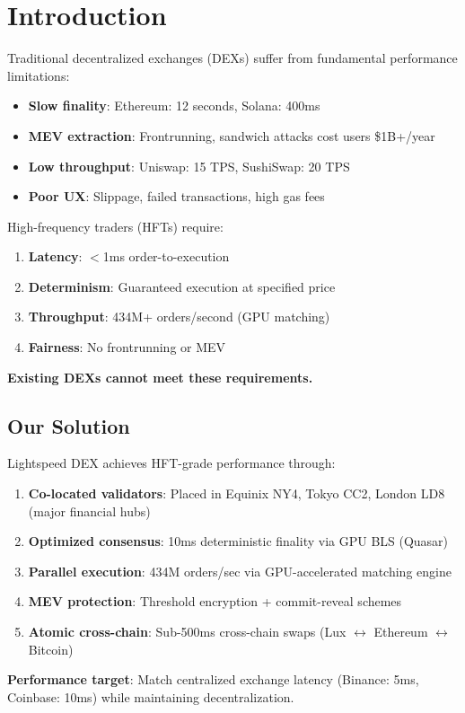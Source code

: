 \section{Introduction}


Traditional decentralized exchanges (DEXs) suffer from fundamental performance limitations:
\begin{itemize}
    \item \textbf{Slow finality}: Ethereum: 12 seconds, Solana: 400ms
    \item \textbf{MEV extraction}: Frontrunning, sandwich attacks cost users \$1B+/year \cite{daian2020}
    \item \textbf{Low throughput}: Uniswap: 15 TPS, SushiSwap: 20 TPS
    \item \textbf{Poor UX}: Slippage, failed transactions, high gas fees
\end{itemize}

High-frequency traders (HFTs) require:
\begin{enumerate}
    \item \textbf{Latency}: $<$1ms order-to-execution
    \item \textbf{Determinism}: Guaranteed execution at specified price
    \item \textbf{Throughput}: 434M+ orders/second (GPU matching)
    \item \textbf{Fairness}: No frontrunning or MEV
\end{enumerate}

\textbf{Existing DEXs cannot meet these requirements.}

\subsection{Our Solution}

Lightspeed DEX achieves HFT-grade performance through:

\begin{enumerate}
    \item \textbf{Co-located validators}: Placed in Equinix NY4, Tokyo CC2, London LD8 (major financial hubs)
    \item \textbf{Optimized consensus}: 10ms deterministic finality via GPU BLS (Quasar)
    \item \textbf{Parallel execution}: 434M orders/sec via GPU-accelerated matching engine
    \item \textbf{MEV protection}: Threshold encryption + commit-reveal schemes
    \item \textbf{Atomic cross-chain}: Sub-500ms cross-chain swaps (Lux $\leftrightarrow$ Ethereum $\leftrightarrow$ Bitcoin)
\end{enumerate}

\textbf{Performance target}: Match centralized exchange latency (Binance: 5ms, Coinbase: 10ms) while maintaining decentralization.

